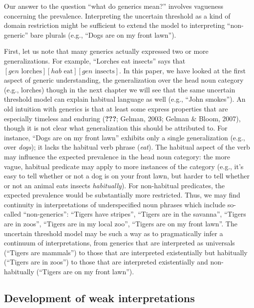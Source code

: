 \documentclass[floatsintext,doc]{apa6}
\theoremstyle{definition}
\theoremstyle{definition}
\theoremstyle{definition}
\theoremstyle{remark}
\begin{document}
Our answer to the question \enquote{what do generics mean?} involves
vagueness concerning the prevalence. Interpreting the uncertain
threshold as a kind of domain restriction might be sufficient to extend
the model to interpreting \enquote{non-generic} bare plurals (e.g.,
\enquote{Dogs are on my front lawn}).

First, let us note that many generics actually expressed two or more
generalizations. For example, \enquote{Lorches eat insects} says that
\([gen \text{ lorches}] [hab \text{ eat}] [gen \text{ insects}]\). In
this paper, we have looked at the first aspect of generic understanding,
the generalization over the head noun category (e.g., lorches) though in
the next chapter we will see that the same uncertain threshold model can
explain habitual language as well (e.g., \enquote{John smokes}). An old
intuition with generics is that at least some express properties that
are especially timeless and enduring ({\textbf{???}}; Gelman, 2003;
Gelman \& Bloom, 2007), though it is not clear what generalization this
should be attributed to. For instance, \enquote{Dogs are on my front
lawn} exhibits only a single generalization (e.g., over \emph{dogs}); it
lacks the habitual verb phrase (\emph{eat}). The habitual aspect of the
verb may influence the expected prevalence in the head noun category:
the more vague, habitual predicate may apply to more instances of the
category (e.g., it's easy to tell whether or not a dog is on your front
lawn, but harder to tell whether or not an animal eats insects
\emph{habitually}). For non-habitual predicates, the expected prevalence
would be substantially more restricted. Thus, we may find continuity in
interpretations of underspecified noun phrases which include so-called
\enquote{non-generics}: \enquote{Tigers have stripes}, \enquote{Tigers
are in the savanna}, \enquote{Tigers are in zoos}, \enquote{Tigers are
in my local zoo}, \enquote{Tigers are on my front lawn}. The uncertain
threshold model may be such a way as to pragmatically infer a continuum
of interpretations, from generics that are interpreted as universals
(\enquote{Tigers are mammals}) to those that are interpreted
existentially but habitually (\enquote{Tigers are in zoos}) to those
that are interpreted existentially and non-habitually (\enquote{Tigers
are on my front lawn}).

\subsection{Development of weak
interpretations}\label{development-of-weak-interpretations}
\end{document}
